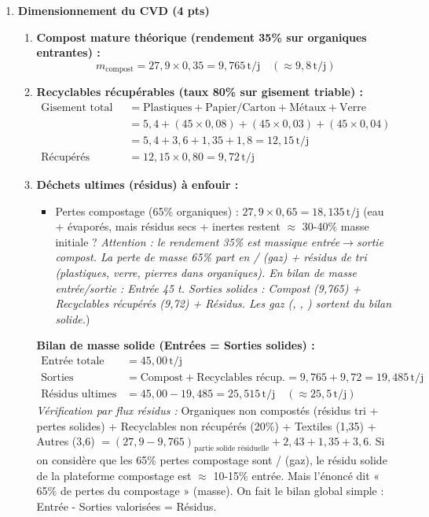 \documentclass[11pt]{article}
\begin{document}
\begin{corrige}
\begin{enumerate}
    \item \textbf{Dimensionnement du CVD (4 pts)}
    \begin{enumerate}
        \item \textbf{Compost mature théorique (rendement 35\% sur organiques entrantes) :}
        \[ m_{\text{compost}} = 27,9 \times 0,35 = \boxed{9,765\,\text{t/j}} \quad (\approx 9,8\,\text{t/j}) \]
        \item \textbf{Recyclables récupérables (taux 80\% sur gisement triable) :}
        \begin{align*}
            \text{Gisement total recyclables} &= \text{Plastiques} + \text{Papier/Carton} + \text{Métaux} + \text{Verre} \\
            &= 5,4 + (45\times0,08) + (45\times0,03) + (45\times0,04) \\
            &= 5,4 + 3,6 + 1,35 + 1,8 = \boxed{12,15\,\text{t/j}} \\
            \text{Récupérés (80\%)} &= 12,15 \times 0,80 = \boxed{9,72\,\text{t/j}}
        \end{align*}
        \item \textbf{Déchets ultimes (résidus) à enfouir :}
        \begin{itemize}
            \item Pertes compostage (65\% organiques) : $27,9 \times 0,65 = 18,135\,\text{t/j}$ (eau +  évaporés, mais résidus secs + inertes restent $\approx$ 30-40\% masse initiale ? \textit{Attention : le rendement 35\% est massique entrée$\rightarrow$sortie compost. La perte de masse 65\% part en / (gaz) + résidus de tri (plastiques, verre, pierres dans organiques). En bilan de masse entrée/sortie : Entrée 45 t. Sorties solides : Compost (9,765) + Recyclables récupérés (9,72) + Résidus. Les gaz (, , ) sortent du bilan solide.})
        \end{itemize}
        \textbf{Bilan de masse solide (Entrées = Sorties solides) :}
        \begin{align*}
            \text{Entrée totale} &= 45,00\,\text{t/j} \\
            \text{Sorties valorisées (solides)} &= \text{Compost} + \text{Recyclables récup.} = 9,765 + 9,72 = 19,485\,\text{t/j} \\
            \text{Résidus ultimes (enfouissement)} &= 45,00 - 19,485 = \boxed{25,515\,\text{t/j}} \quad (\approx 25,5\,\text{t/j})
        \end{align*}
        \textit{Vérification par flux résidus :} 
        Organiques non compostés (résidus tri + pertes solides) + Recyclables non récupérés (20\%) + Textiles (1,35) + Autres (3,6) 
        $= (27,9 - 9,765)_{\text{partie solide résiduelle}} + 2,43 + 1,35 + 3,6$. 
        Si on considère que les 65\% pertes compostage sont / (gaz), le résidu solide de la plateforme compostage est $\approx$ 10-15\% entrée. Mais l'énoncé dit « 65\% de pertes du compostage » (masse). On fait le bilan global simple : Entrée - Sorties valorisées = Résidus.
    \end{enumerate}


\end{enumerate}
\end{corrige}
\end{document}
